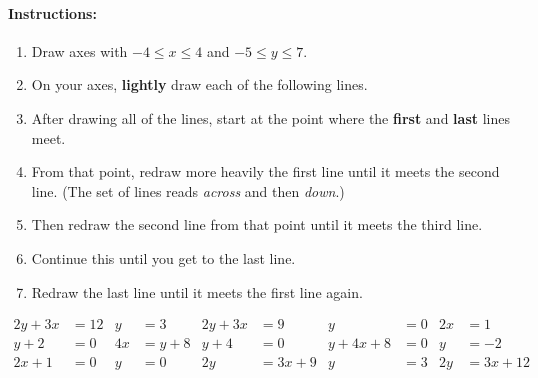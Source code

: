 \documentclass{article}
\def\Instructions{%
  \clearpage
\paragraph{Instructions:}
\begin{enumerate}
\item Draw axes with \(-4 \le x \le 4\) and \(-5 \le y \le 7\).
\item On your axes, \textbf{lightly} draw each of the following lines.
\item After drawing all of the lines, start at the point where the \textbf{first} and \textbf{last} lines meet.
\item From that point, redraw more heavily the first line until it meets the second line.
(The set of lines reads \emph{across} and then \emph{down}.)
\item Then redraw the second line from that point until it meets the third line.
\item Continue this until you get to the last line.
\item Redraw the last line until it meets the first line again.
\end{enumerate}
}
\begin{document}
\Instructions

\begin{align*}
2 y + 3 x &= 12
& y &= 3
& 2y + 3x &= 9
& y &= 0
& 2 x &= 1
\\ y + 2&= 0
& 4x &= y + 8
& y + 4 &= 0
& y + 4x + 8 &= 0
& y &= -2 
\\ 2x + 1 &= 0
& y &= 0
& 2 y &= 3x + 9
& y &= 3
& 2 y &= 3x + 12
\end{align*}
\end{document}

